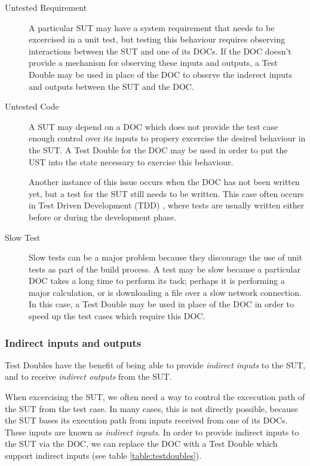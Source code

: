 \begin{description}

\item [Untested Requirement] A particular SUT may have a system
  requirement that needs to be excercised in a unit test, but testing
  this behaviour requires observing interactions between the SUT and
  one of its DOCs. If the DOC doesn't provide a mechanism for
  observing these inputs and outputs, a Test Double may be used in
  place of the DOC to observe the inderect inputs and outputs between
  the SUT and the DOC.

\item [Untested Code] A SUT may depend on a DOC which does not provide
  the test case enough control over its inputs to propery excercise
  the desired behaviour in the SUT. A Test Double for the DOC may be
  used in order to put the UST into the state necessary to exercise
  this behaviour.

  Another instance of this issue occurs when the DOC has not been
  written yet, but a test for the SUT still needs to be written. This
  case often occurs in Test Driven Development (TDD) \cite{beck:tdd},
  where tests are usually written either before or during the
  development phase.

\item [Slow Test] Slow tests can be a major problem because they
  discourage the use of unit tests as part of the build process. A
  test may be slow because a particular DOC takes a long time to
  perform its task; perhaps it is performing a major calculation, or
  is downloading a file over a slow network connection. In this case,
  a Test Double may be used in place of the DOC in order to speed up
  the test cases which require this DOC.

\end{description}

\subsubsection{Indirect inputs and outputs}

Test Doubles have the benefit of being able to provide
\textit{indirect inputs} to the SUT, and to receive \textit{indirect
  outputs} from the SUT.

When excercising the SUT, we often need a way to control the
excecution path of the SUT from the test case. In many cases, this is
not directly possible, because the SUT bases its execution path from
inputs received from one of its DOCs. These inputs are known as
\textit{indirect inputs}. In order to provide indirect inputs to the
SUT via the DOC, we can replace the DOC with a Test Double which
support indirect inputs (see table \ref{table:testdoubles}).

